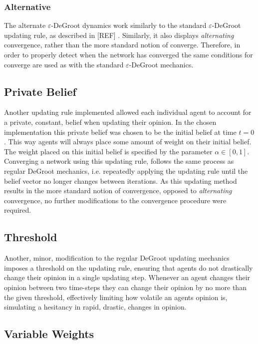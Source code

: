 \documentclass{article}
\begin{document}
\subsubsection{Alternative}

The alternate $\varepsilon$-DeGroot dynamics work similarly to the standard $\varepsilon$-DeGroot updating rule, as described in [REF] . Similarly, it also displays \textit{alternating} convergence, rather than the more standard notion of converge. Therefore, in order to properly detect when the network has converged the same conditions for converge are used as with the standard $\varepsilon$-DeGroot mechanics.

\subsection{Private Belief}

Another updating rule implemented allowed each individual agent to account for a private, constant, belief when updating their opinion. In the chosen implementation this private belief was chosen to be the initial belief at time $t=0$. This way agents will always place some amount of weight on their initial belief. The weight placed on this initial belief is specified by the parameter $\alpha \in [0, 1]$. Converging a network using this updating rule, follows the same process as regular DeGroot mechanics, i.e. repeatedly applying the updating rule until the belief vector no longer changes between iterations. As this updating method results in the more standard notion of convergence, opposed to \textit{alternating} convergence, no further modifications to the convergence procedure were required.

\subsection{Threshold}

Another, minor, modification to the regular DeGroot updating mechanics imposes a threshold on the updating rule, ensuring that agents do not drastically change their opinion in a single updating step. Whenever an agent changes their opinion between two time-steps they can change their opinion by no more than the given threshold, effectively limiting how volatile an agents opinion is, simulating a hesitancy in rapid, drastic, changes in opinion.

\subsection{Variable Weights}
\end{document}
